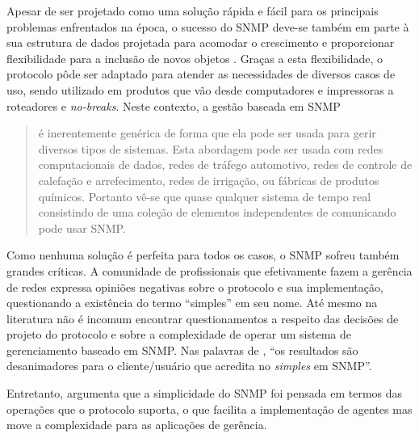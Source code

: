 \documentclass[twoside,english,brazilian]{UNISINOSmonografia}
\begin{document}
Apesar de ser projetado como uma solução rápida e fácil para os principais 
problemas enfrentados na época, o sucesso do SNMP deve-se também em parte à 
sua estrutura de dados projetada para acomodar o crescimento e proporcionar 
flexibilidade para a inclusão de novos objetos \cite{stallings1999snmp}.
Graças a esta flexibilidade, o protocolo pôde ser adaptado para atender as 
necessidades de diversos casos de uso, sendo utilizado em produtos que vão 
desde computadores e impressoras a roteadores e \textit{no-breaks}.
Neste contexto, a gestão baseada em SNMP

\begin{quote}
é inerentemente genérica de forma que ela pode ser usada para gerir diversos 
tipos de sistemas. Esta abordagem pode ser usada com redes computacionais de 
dados, redes de tráfego automotivo, redes de controle de calefação e 
arrefecimento, redes de irrigação, ou fábricas de produtos químicos. Portanto 
vê-se que quase qualquer sistema de tempo real consistindo de uma coleção de 
elementos independentes de comunicando pode usar SNMP.
\cite[p.~2]{perkins1997understanding}
\end{quote}

Como nenhuma solução é perfeita para todos os casos, o SNMP sofreu também 
grandes críticas. 
A comunidade de profissionais que efetivamente fazem a gerência de redes 
expressa opiniões negativas sobre o protocolo e sua implementação, 
questionando a existência do termo ``simples'' em seu nome.
Até mesmo na literatura não é incomum encontrar questionamentos a respeito das 
decisões de projeto do protocolo e sobre a complexidade de operar um sistema 
de gerenciamento baseado em SNMP.
Nas palavras de , ``os resultados são 
desanimadores para o cliente/usuário que acredita no 
\textit{simples} em SNMP''.


Entretanto,  argumenta que a simplicidade do SNMP foi 
pensada em termos das operações que o protocolo suporta, o que facilita a 
implementação de agentes mas move a complexidade para as aplicações de 
gerência.
\end{document}
